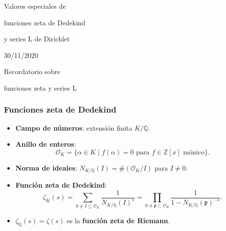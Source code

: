 \documentclass{beamer}
\newcommand{\ZZ}{\mathbb{Z}}
\newcommand{\QQ}{\mathbb{Q}}
\renewcommand{\O}{\mathcal{O}}
\begin{document}

\begin{frame}[noframenumbering]
  \headingfont
  \begin{center}
    {\huge Valores especiales de

      funciones zeta de Dedekind

      y series L de Dirichlet

    }

    \vspace{3em}

    30/11/2020

  \end{center}
\end{frame}


\begin{frame}[plain]
  \headingfont

  \begin{center}
    {\huge Recordatorio sobre

      funciones zeta y series L

    }
  \end{center}
\end{frame}


\begin{frame}
  \frametitle{Funciones zeta de Dedekind}

  \begin{itemize}
  \item<1-> \textbf{Campo de números}: extensión finita $K/\QQ$.

  \item<2-> \textbf{Anillo de enteros}:
    $$\O_K = \{ \alpha \in K \mid f (\alpha) = 0\text{ para }f \in \ZZ[x]\text{ mónico} \}.$$

  \item<3-> \textbf{Norma de ideales}: $N_{K/\QQ} (I) = \# (\O_K/I)$ para $I \ne 0$.

  \item<4-> \textbf{Función zeta de Dedekind}:
    $$\zeta_K (s) = \sum_{0 \ne I \subseteq \O_K} \frac{1}{N_{K/\QQ} (I)^s} = \prod_{0 \ne \mathfrak{p} \subset \O_K} \frac{1}{1 - N_{K/\QQ} (\mathfrak{p})^{-s}}.$$

  \item<5-> $\zeta_\QQ (s) = \zeta (s)$ es la \textbf{función zeta de Riemann}.
  \end{itemize}
\end{frame}
\end{document}
